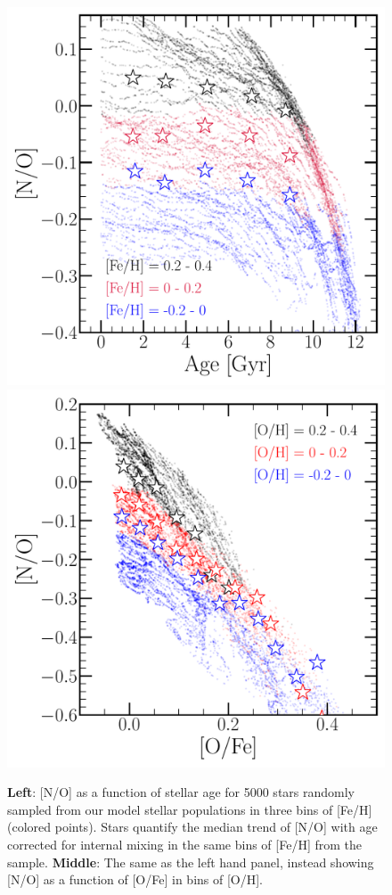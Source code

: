 \documentclass[ms.tex]{subfiles}
\begin{document}
\begin{figure} 
\centering 
\includegraphics[scale = 0.45]{no_vs_age.pdf} 
\includegraphics[scale = 0.45]{no_vs_ofe.pdf} 
\caption{
\textbf{Left}: [N/O] as a function of stellar age for 5000 stars randomly 
sampled from our model stellar populations in three bins of [Fe/H] (colored 
points). 
Stars quantify the median trend of [N/O] with age corrected for internal mixing 
in the same bins of [Fe/H] from the~\citet{Vincenzo2021} sample. 
\textbf{Middle}: The same as the left hand panel, instead showing [N/O] as a 
function of [O/Fe] in bins of [O/H]. 
} 
\label{fig:vincenzo_comp} 
\end{figure} 
\end{document}
